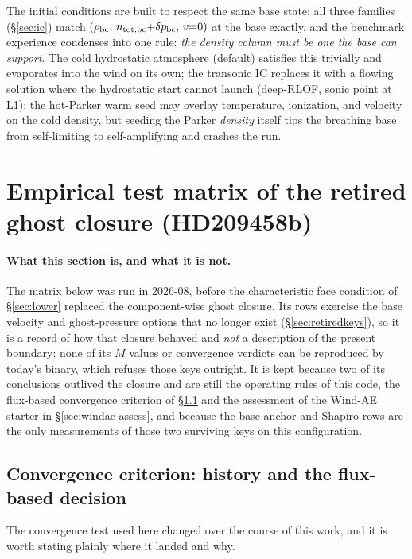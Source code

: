 \documentclass[english,a4paper]{my_memo}
\begin{document}
The initial conditions are built to respect the same base state: all
three families (\S\ref{sec:ic}) match
$(\rho_{\rm bc},\, n_{\rm tot,bc}{+}\delta p_{\rm bc},\, v{=}0)$ at the base
exactly, and the benchmark experience condenses into one rule: \emph{the
density column must be one the base can support}. The cold hydrostatic
atmosphere (default) satisfies this trivially and evaporates into the
wind on its own; the transonic IC replaces it with a flowing solution
where the hydrostatic start cannot launch (deep-RLOF, sonic point at
L1); the hot-Parker warm seed may overlay temperature, ionization, and
velocity on the cold density, but seeding the Parker \emph{density}
itself tips the breathing base from self-limiting to self-amplifying
and crashes the run.


\section{Empirical test matrix of the retired ghost closure (HD209458b)}
\label{sec:bc-matrix}

\paragraph{What this section is, and what it is not.} The matrix below was
run in 2026-08, before the characteristic face condition of
\S\ref{sec:lower} replaced the component-wise ghost closure. Its rows
exercise the base velocity and ghost-pressure options that no longer exist
(\S\ref{sec:retiredkeys}), so it is a record of how that closure behaved
and \emph{not} a description of the present boundary: none of its
$\dot M$ values or convergence verdicts can be reproduced by today's binary,
which refuses those keys outright. It is kept because two of its conclusions
outlived the closure and are still the operating rules of this code, the
flux-based convergence criterion of \S\ref{sec:conv-criterion} and the
assessment of the Wind-AE starter in \S\ref{sec:windae-assess}, and
because the base-anchor and Shapiro rows are the only measurements of those
two surviving keys on this configuration.

\subsection{Convergence criterion: history and the flux-based decision}
\label{sec:conv-criterion}

The convergence test used here changed over the course of this work, and it is
worth stating plainly where it landed and why.
\end{document}
